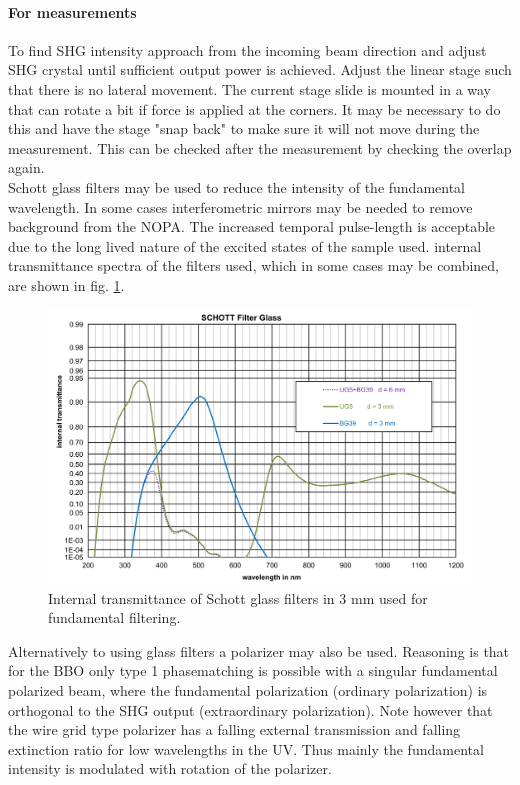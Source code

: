 \documentclass[twoside,openright]{scrreprt}
\begin{document}
\paragraph{For measurements}
To find SHG intensity approach from the incoming beam direction and adjust SHG crystal until sufficient output power is achieved.\newline
Adjust the linear stage such that there is no lateral movement. The current stage slide is mounted in a way that can rotate a bit if force is applied at the corners. It may be necessary to do this and have the stage "snap back" to make sure it will not move during the measurement. This can be checked after the measurement by checking the overlap again.\\
Schott glass filters may be used to reduce the intensity of the fundamental wavelength. In some cases interferometric mirrors may be needed to remove background from the NOPA. The increased temporal pulse-length is acceptable due to the long lived nature of the excited states of the sample used. internal transmittance spectra of the filters used, which in some cases may be combined, are shown in fig. \ref{fig:SchottFilters}.

\begin{figure}[hbtp]
\centering
\includegraphics[scale = 1]{images/SchottFiltersFromTool.png}
\caption{Internal transmittance of Schott glass filters in 3 mm used for fundamental filtering.\label{fig:SchottFilters}}
\end{figure}

Alternatively to using glass filters a polarizer may also be used. Reasoning is that for the BBO only type 1 phasematching is possible with a singular fundamental polarized beam, where the fundamental polarization (ordinary polarization) is orthogonal to the SHG output (extraordinary polarization). Note however that the wire grid type polarizer has a falling external transmission and falling extinction ratio for low wavelengths in the UV. Thus mainly the fundamental intensity is modulated with rotation of the polarizer.
\end{document}
